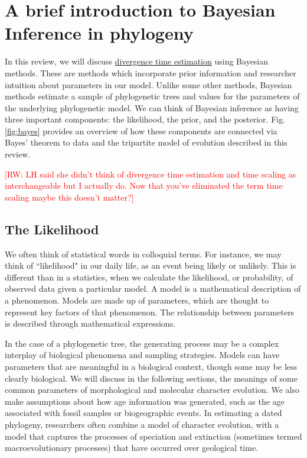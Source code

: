 \documentclass[11pt]{article}
\newcommand{\rw}[1]{{\textcolor{red}{[RW: #1]}}} %
\begin{document}
\section{A brief introduction to Bayesian Inference in phylogeny}

In this review, we will discuss \underline{divergence time estimation} using Bayesian methods. 
These are methods which incorporate prior information and researcher intuition about parameters in our model.
Unlike some other methods, Bayesian methods estimate a sample of phylogenetic trees and values for the parameters of the underlying phylogenetic model.
We can think of Bayesian inference as having three important components: the likelihood, the prior, and the posterior.
Fig. \ref{fig:bayes} provides an overview of how these components are connected via Bayes' theorem to data and the tripartite model of evolution described in this review.

\rw{LH said she didn't think of divergence time estimation and time scaling as interchangeable but I actually do. Now that you've eliminated the term time scaling maybe this doesn't matter?}

\subsection{The Likelihood}

We often think of statistical words in colloquial terms.
For instance, we may think of ``likelihood" in our daily life, as an event being likely or unlikely. 
This is different than in a statistics, when we calculate the likelihood, or probability, of observed data given a particular model.
A model is a mathematical description of a phenomenon.
Models are made up of parameters, which are thought to represent key factors of that phenomenon.
The relationship between parameters is described through mathematical expressions.


In the case of a phylogenetic tree, the generating process may be a complex interplay of biological phenomena and sampling strategies.
Models can have parameters that are meaningful in a biological context, though some may be less clearly biological.
We will discuss in the following sections, the meanings of some common parameters of morphological and molecular character evolution.
We also make assumptions about how age information was generated, such as the age associated with fossil samples or biogeographic events.
In estimating a dated phylogeny, researchers often combine a model of character evolution, with a model that captures the processes of speciation and extinction (sometimes termed macroevolutionary processes) that have occurred over geological time.
\end{document}

